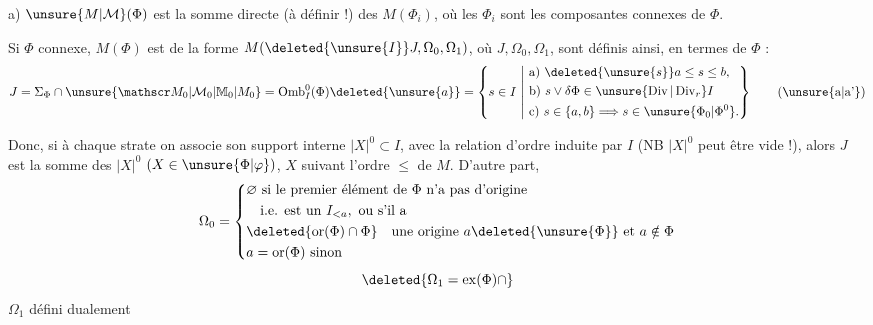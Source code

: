 a) $\unsure{M|\mathcal M}(\Phi)$ est la somme directe (à définir !) des $M(\Phi_i)$, où les $\Phi_i$ sont les composantes connexes de $\Phi$.

 Si $\Phi$  connexe,  $M(\Phi)$ est de la forme $M(\deleted{\unsure{I}}J,\Omega_0,\Omega_1)$, où $J,\Omega_0,\Omega_1$, sont définis ainsi, en termes de $\Phi$ :
\[
J=\Sigma_{\Phi}\cap\unsure{\mathscr M_0|\mathcal M_0|\mathbb M_0|M_0}
=\operatorname{Omb}^{0}_{I}(\Phi)\deleted{\unsure{a}}
=\left\{s\in I\ \middle|\
\begin{aligned}
&\text{a) }\deleted{\unsure{s}}a\leq s\leq b,\\
&\text{b) }s\vee\delta\Phi\in\unsure{\operatorname{Div}|\operatorname{Div}_{r}}I\\
&\text{c) }s\in\{a,b\}\Longrightarrow s\in\unsure{\Phi_0|\Phi^{0}}.
\end{aligned}\right\}
\tag*{(\unsure{a|a'})}
\]


Donc, si à chaque strate  on associe son support interne $|X|^{0}\subset I$, avec la relation d'ordre induite par $I$ (NB $|X|^{0}$ peut être vide  !), alors $J$ est la somme   des $|X|^{0}$ $(X\in\unsure{\Phi|\varphi})$, $X$ suivant  l'ordre $\leq$ de $M$. D'autre part, 
\[
\Omega_0=
\left\{\begin{aligned}
&\varnothing\text{ si le premier élément de }\Phi\text{ n'a pas d'origine}\\
&\quad\text{i.e. est un }I_{<a},\text{ ou s'il a}\\
&\deleted{\operatorname{or}(\Phi)\cap\Phi}\quad\text{une origine }a\deleted{\unsure{\Phi}}\text{ et }a\notin\Phi\\
&a=\operatorname{or}(\Phi)\text{ sinon}
\end{aligned}\right.
\]
\[
\deleted{\Omega_1=\operatorname{ex}(\Phi)\cap}
\]
$\Omega_1$ défini dualement

